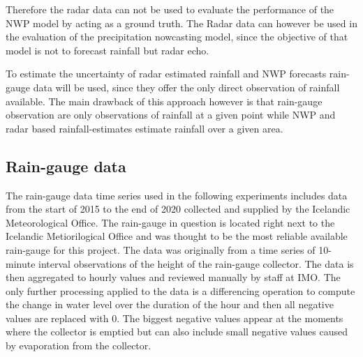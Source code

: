 Therefore the radar data can not be used to evaluate the performance of the NWP model by acting as a ground truth. The Radar data can however be used in the evaluation of the precipitation nowcasting model, since the objective of that model is not to forecast rainfall but radar echo. 

To estimate the uncertainty of radar estimated rainfall and NWP forecasts rain-gauge data will be used, since they offer the only direct observation of rainfall available. The main drawback of this approach however is that rain-gauge observation are only observations of rainfall at a given point while NWP and radar based rainfall-estimates estimate rainfall over a given area. 


\subsection{Rain-gauge data}
The rain-gauge data time series used in the following experiments includes data from the start of 2015 to the end of 2020 collected and supplied by the Icelandic Meteorological Office. The rain-gauge in question is located right next to the Icelandic Metiorilogical Office and was thought to be the most reliable available rain-gauge for this project. The data was originally from a time series of 10-minute interval observations of the height of the rain-gauge collector. The data is then aggregated to hourly values and reviewed manually by staff at IMO. The only further processing applied to the data is a differencing operation to compute the change in water level over the duration of the hour and then all negative values are replaced with 0. The biggest negative values appear at the moments where the collector is emptied but can also include small negative values caused by evaporation from the collector. 


